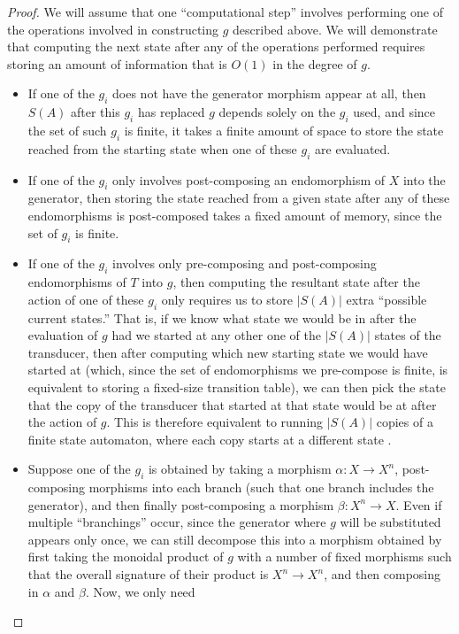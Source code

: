 \documentclass{article}
\theoremstyle{definition}
\theoremstyle{remark}
\begin{document}
\begin{proof}
We will assume that one ``computational step'' involves performing one
of the operations involved in constructing $g$ described above. We
will demonstrate that computing the next state after
any of the operations performed requires storing an amount of information
that is $O(1)$ in the degree of $g$.
\begin{itemize}
\item If one of the $g_i$ does not have the generator morphism appear
at all, then $S(A)$ after this $g_i$ has replaced $g$ depends solely
on the $g_i$ used, and since the set of such $g_i$ is finite, it takes
a finite amount of space to store the state reached from the starting
state when one of these $g_i$ are evaluated. 
\item If one of the $g_i$ only involves post-composing an endomorphism
of $X$ into the generator, then storing the state reached from a given
state after any of these endomorphisms is post-composed takes a fixed
amount of memory, since the set of $g_i$ is finite.
\item If one of the $g_i$ involves only pre-composing and post-composing
endomorphisms of $T$ into $g$, then computing the resultant state after
the action of one of these $g_i$ only requires us to store $|S(A)|$
extra ``possible current states.'' That is, if we know what state we
would be in after the evaluation of $g$ had we started at any other
one of the $|S(A)|$ states of the transducer, then after computing
which new starting state we would have started at (which, since the
set of endomorphisms we pre-compose is finite, is equivalent to storing
a fixed-size transition table), we can then pick
the state that the copy of the transducer that started at that state
would be at after the action of $g$. This is therefore equivalent
to running $|S(A)|$ copies of a finite state automaton, where each
copy starts at a different state .
\item Suppose one of the $g_i$ is obtained by taking a morphism
$\alpha:X\to X^n$, post-composing morphisms into each branch (such that
one branch includes the generator), and then finally post-composing
a morphism $\beta:X^n \to X$. Even if
multiple ``branchings'' occur, since the generator where $g$ will
be substituted appears only once, we can still decompose this
into a morphism obtained by
first taking the monoidal product of $g$ with a number of fixed
morphisms such that the overall signature of their product is
$X^n \to X^n$, and then composing in $\alpha$ and $\beta$.
Now, we only need

\end{itemize}
\end{proof}
\end{document}
